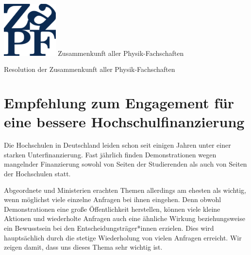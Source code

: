 \documentclass[DIV=calc]{scrartcl}
\begin{document}
\hspace{0.87\textwidth}
\begin{minipage}{120pt}
\vspace{-1.8cm}
\includegraphics[width=80pt]{logo.pdf}
\centering
\small Zusammenkunft aller Physik-Fachschaften
\end{minipage}
\begin{center}
\huge{Resolution der Zusammenkunft aller Physik-Fachschaften} \\
\normalsize
\end{center}

\vspace{1cm}
\section*{Empfehlung zum Engagement für eine bessere Hochschulfinanzierung}

Die Hochschulen in Deutschland leiden schon seit einigen Jahren unter einer starken Unterfinanzierung. Fast jährlich finden Demonstrationen wegen mangelnder Finanzierung sowohl von Seiten der Studierenden als auch von Seiten der Hochschulen statt. 

Abgeordnete und Ministerien erachten Themen allerdings am ehesten als wichtig, wenn möglichst viele einzelne Anfragen bei ihnen eingehen. Denn obwohl Demonstrationen eine große Öffentlichkeit herstellen, können viele kleine Aktionen und wiederholte Anfragen auch eine ähnliche Wirkung beziehungsweise ein Bewusstsein bei den Entscheidungsträger*innen erzielen. Dies wird hauptsächlich durch die stetige Wiederholung von vielen Anfragen erreicht. Wir zeigen damit, dass uns dieses Thema sehr wichtig ist. 
\end{document}
